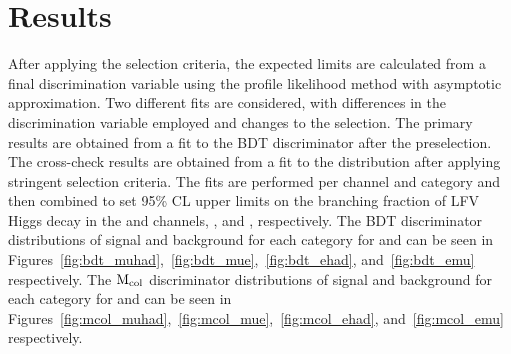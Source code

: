 %
%

\chapter{Results}
\label{results}

After applying the selection criteria, the expected limits are calculated from a final discrimination variable using the profile likelihood method with asymptotic approximation. Two different fits are considered, with differences in the discrimination variable employed and changes to the selection. The primary results are obtained from a fit to the BDT discriminator after the preselection. The cross-check results are obtained from a fit to the \mcol distribution after applying stringent selection criteria. The fits are performed per channel and category and then combined to set 95\% CL upper limits on the branching fraction of LFV Higgs decay in the \Hmt and \Het channels, \BHmt, and \BHet, respectively. The BDT discriminator distributions of signal and background for each category for \Hmt and \Het can be seen in Figures~\ref{fig:bdt_muhad},~\ref{fig:bdt_mue},~\ref{fig:bdt_ehad}, and~\ref{fig:bdt_emu} respectively. The $\text{M}_{\text{col}}$ discriminator distributions of signal and background for each category for \Hmt and \Het can be seen in Figures~\ref{fig:mcol_muhad},~\ref{fig:mcol_mue},~\ref{fig:mcol_ehad}, and~\ref{fig:mcol_emu} respectively.

